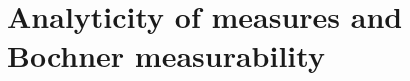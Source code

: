 \section{Analyticity of measures and Bochner measurability}
\newtheorem{propertyg2}{Proposition}[section]
\newtheorem{firstrelation}[propertyg2]{Lemma}
\newtheorem{secondrelation}[propertyg2]{Lemma}
\newtheorem{minimaintheorem}[propertyg2]{Main Theorem}
\newtheorem{poissonlimit}[propertyg2]{Theorem}
\newtheorem{continuity}[propertyg2]{Theorem}
\newtheorem{stronganalytic}[propertyg2]{Definition}
\newtheorem{spect=spectx}[propertyg2]{Lemma}
\newtheorem{corbigmaintheorem2}[propertyg2]{Theorem}
\newtheorem{8nov94remark}[propertyg2]{Remark}
\newtheorem{applem1}[propertyg2]{Lemma}
\newtheorem{appcor1}[propertyg2]{Corollary}
\newtheorem{appcor2}[propertyg2]{Corollary}

